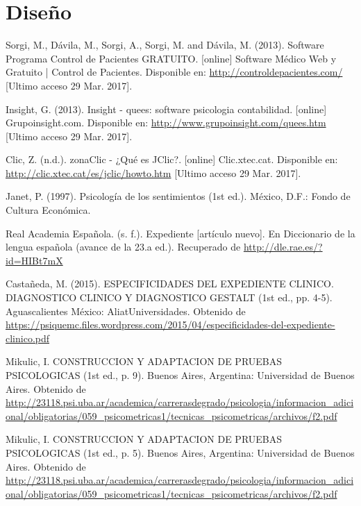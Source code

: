 \documentclass[oneside,12pt]{book}
\begin{document}
\chapter{Diseño}


\begin{thebibliography}{50}

Sorgi, M., Dávila, M., Sorgi, A., Sorgi, M. and Dávila, M. (2013). Software Programa Control de Pacientes GRATUITO. [online] Software Médico Web y Gratuito | Control de Pacientes. Disponible en: \url{http://controldepacientes.com/} [Ultimo acceso 29 Mar. 2017].

Insight, G. (2013). Insight - quees: software psicologia contabilidad. [online] Grupoinsight.com. Disponible en: \url{http://www.grupoinsight.com/quees.htm} [Ultimo acceso 29 Mar. 2017].

Clic, Z. (n.d.). zonaClic - ¿Qué es JClic?. [online] Clic.xtec.cat. Disponible en: \url{http://clic.xtec.cat/es/jclic/howto.htm} [Ultimo acceso 29 Mar. 2017].

 Janet, P. (1997). Psicología de los sentimientos (1st ed.). México, D.F.: Fondo de Cultura Económica.

Real Academia Española. (s. f.). Expediente [artículo nuevo]. En Diccionario de la lengua española (avance de la 23.a ed.). Recuperado de \url{http://dle.rae.es/?id=HIBt7mX}

Castañeda, M. (2015). ESPECIFICIDADES DEL EXPEDIENTE CLINICO. DIAGNOSTICO CLINICO Y DIAGNOSTICO GESTALT (1st ed., pp. 4-5). Aguascalientes México: AliatUniversidades. Obtenido de \url{https://psiquemc.files.wordpress.com/2015/04/especificidades-del-expediente-clinico.pdf}

Mikulic, I. CONSTRUCCION Y ADAPTACION DE PRUEBAS PSICOLOGICAS (1st ed., p. 9). Buenos Aires, Argentina: Universidad de Buenos Aires. Obtenido de \url{http://23118.psi.uba.ar/academica/carrerasdegrado/psicologia/informacion_adicional/obligatorias/059_psicometricas1/tecnicas_psicometricas/archivos/f2.pdf}

Mikulic, I. CONSTRUCCION Y ADAPTACION DE PRUEBAS PSICOLOGICAS (1st ed., p. 5). Buenos Aires, Argentina: Universidad de Buenos Aires. Obtenido de \url{http://23118.psi.uba.ar/academica/carrerasdegrado/psicologia/informacion_adicional/obligatorias/059_psicometricas1/tecnicas_psicometricas/archivos/f2.pdf}


\end{thebibliography}
\end{document}
